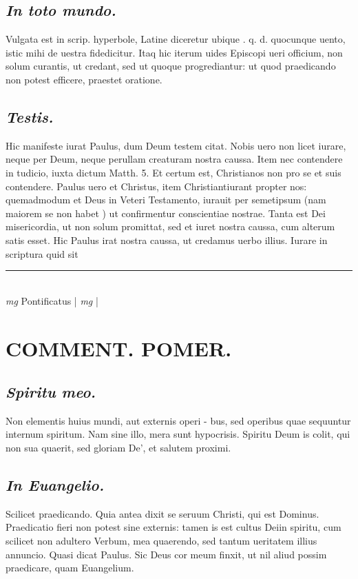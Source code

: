 \documentclass{article}
\begin{document}
\begin{pages}
\subsection*{\textit{In toto mundo. }}\pstart Vulgata est in scrip. hyperbole, Latine diceretur ubique . q. d. quocunque uento, istic mihi de uestra fidedicitur. Itaq hic iterum uides Episcopi ueri officium, non solum curantis, ut credant, sed ut quoque progrediantur: ut quod praedicando non potest efficere, praestet oratione.  \pend
{}
{}
\subsection*{\textit{Testis. }}\pstart Hic manifeste iurat Paulus, dum Deum testem citat.  Nobis uero non licet iurare, neque per Deum, neque perullam creaturam nostra caussa. Item nec contendere in tudicio, iuxta dictum Matth. 5. Et certum est, Christianos non pro se et suis contendere. Paulus uero et Christus, item Christiantiurant propter nos: quemadmodum et Deus in Veteri Testamento, iurauit per semetipsum (nam maiorem se non habet ) ut confirmentur conscientiae nostrae. Tanta est Dei misericordia, ut non solum promittat, sed et iuret nostra caussa, cum alterum satis esset. Hic Paulus irat nostra caussa, ut credamus uerbo illius. Iurare in scriptura quid sit  \pend
\vspace{0.5cm}\noindent
\vspace{0.2cm}\rule{1cm}{0.2pt}\\ 
\hspace{0.2cm}\textit{mg}
\footnotesize Pontificatus 
\normalsize| 
\hspace{0.2cm}\textit{mg}
\footnotesize 
\normalsize| 
\section*{COMMENT. POMER.  }
{}
\subsection*{\textit{Spiritu meo. }}\pstart Non elementis huius mundi, aut externis operi - bus, sed operibus quae sequuntur internum spiritum.  Nam sine illo, mera sunt hypocrisis. Spiritu Deum is colit, qui non sua quaerit, sed gloriam De', et salutem proximi.   \pend
{}
{}
\subsection*{\textit{In Euangelio. }}\pstart Scilicet praedicando. Quia antea dixit se seruum Christi, qui est Dominus. Praedicatio fieri non potest sine externis: tamen is est cultus Deiin spiritu, cum scilicet non adultero Verbum, mea quaerendo, sed tantum ueritatem illius annuncio. Quasi dicat Paulus.  Sic Deus cor meum finxit, ut nil aliud possim praedicare, quam Euangelium.   \pend
{}
{}

\end{pages}
\end{document}
